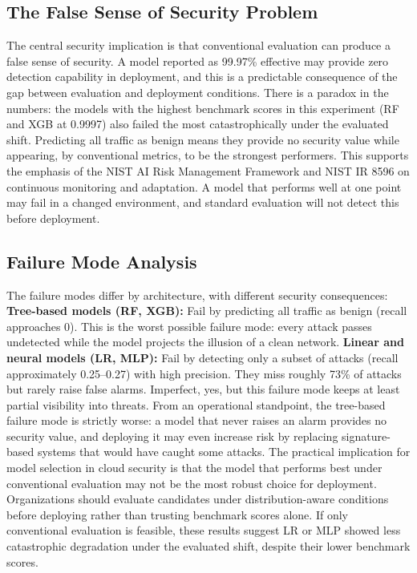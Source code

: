 \documentclass[10pt]{article}
\begin{document}
\subsection{The False Sense of Security Problem}
The central security implication is that conventional evaluation can produce a false sense of security. A model reported as 99.97\% effective may provide zero detection capability in deployment, and this is a predictable consequence of the gap between evaluation and deployment conditions.
There is a paradox in the numbers: the models with the highest benchmark scores in this experiment (RF and XGB at 0.9997) also failed the most catastrophically under the evaluated shift. Predicting all traffic as benign means they provide no security value while appearing, by conventional metrics, to be the strongest performers. This supports the emphasis of the NIST AI Risk Management Framework and NIST IR 8596 on continuous monitoring and adaptation. A model that performs well at one point may fail in a changed environment, and standard evaluation will not detect this before deployment.
\subsection{Failure Mode Analysis}
The failure modes differ by architecture, with different security consequences:
\textbf{Tree-based models (RF, XGB):} Fail by predicting all traffic as benign (recall approaches 0). This is the worst possible failure mode: every attack passes undetected while the model projects the illusion of a clean network.
\textbf{Linear and neural models (LR, MLP):} Fail by detecting only a subset of attacks (recall approximately 0.25--0.27) with high precision. They miss roughly 73\% of attacks but rarely raise false alarms. Imperfect, yes, but this failure mode keeps at least partial visibility into threats.
From an operational standpoint, the tree-based failure mode is strictly worse: a model that never raises an alarm provides no security value, and deploying it may even increase risk by replacing signature-based systems that would have caught some attacks. The practical implication for model selection in cloud security is that the model that performs best under conventional evaluation may not be the most robust choice for deployment. Organizations should evaluate candidates under distribution-aware conditions before deploying rather than trusting benchmark scores alone. If only conventional evaluation is feasible, these results suggest LR or MLP showed less catastrophic degradation under the evaluated shift, despite their lower benchmark scores.
\end{document}
